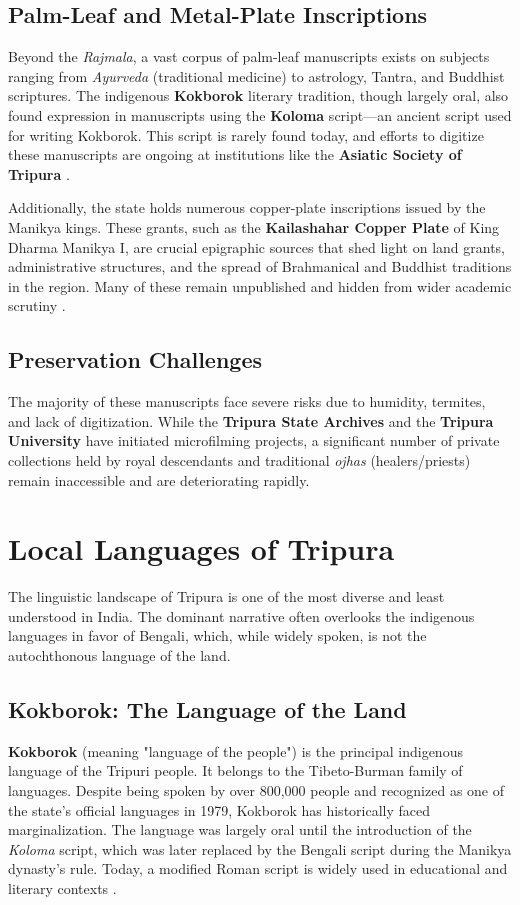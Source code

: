 \documentclass{article}
\begin{document}
\subsection{Palm-Leaf and Metal-Plate Inscriptions}
Beyond the \textit{Rajmala}, a vast corpus of palm-leaf manuscripts exists on subjects ranging from \textit{Ayurveda} (traditional medicine) to astrology, Tantra, and Buddhist scriptures. The indigenous \textbf{Kokborok} literary tradition, though largely oral, also found expression in manuscripts using the \textbf{Koloma} script—an ancient script used for writing Kokborok. This script is rarely found today, and efforts to digitize these manuscripts are ongoing at institutions like the \textbf{Asiatic Society of Tripura} \cite{debbarma2020}.

Additionally, the state holds numerous copper-plate inscriptions issued by the Manikya kings. These grants, such as the \textbf{Kailashahar Copper Plate} of King Dharma Manikya I, are crucial epigraphic sources that shed light on land grants, administrative structures, and the spread of Brahmanical and Buddhist traditions in the region. Many of these remain unpublished and hidden from wider academic scrutiny \cite{sarma2016}.

\subsection{Preservation Challenges}
The majority of these manuscripts face severe risks due to humidity, termites, and lack of digitization. While the \textbf{Tripura State Archives} and the \textbf{Tripura University} have initiated microfilming projects, a significant number of private collections held by royal descendants and traditional \textit{ojhas} (healers/priests) remain inaccessible and are deteriorating rapidly.

\section{Local Languages of Tripura}

The linguistic landscape of Tripura is one of the most diverse and least understood in India. The dominant narrative often overlooks the indigenous languages in favor of Bengali, which, while widely spoken, is not the autochthonous language of the land.

\subsection{Kokborok: The Language of the Land}
\textbf{Kokborok} (meaning "language of the people") is the principal indigenous language of the Tripuri people. It belongs to the Tibeto-Burman family of languages. Despite being spoken by over 800,000 people and recognized as one of the state's official languages in 1979, Kokborok has historically faced marginalization. The language was largely oral until the introduction of the \textit{Koloma} script, which was later replaced by the Bengali script during the Manikya dynasty's rule. Today, a modified Roman script is widely used in educational and literary contexts \cite{twipra2017}.
\end{document}
